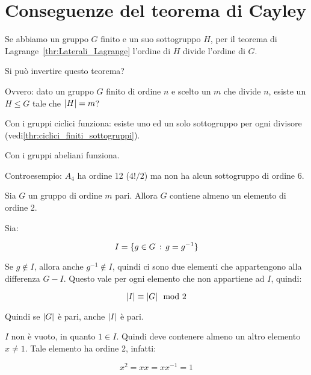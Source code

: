 \chapter{Conseguenze del teorema di Cayley}

Se abbiamo un gruppo $G$ finito e un suo sottogruppo $H$, per il teorema di Lagrange~\ref{thr:Laterali_Lagrange} l'ordine di $H$ divide l'ordine di $G$.

Si può invertire questo teorema?

Ovvero: dato un gruppo $G$ finito di ordine $n$ e scelto un $m$ che divide $n$, esiste un $H \le G$ tale che $\lvert H \rvert = m$?

Con i gruppi ciclici funziona: esiste uno ed un solo sottogruppo per ogni divisore (vedi\ref{thr:ciclici_finiti_sottogruppi}).

Con i gruppi abeliani funziona.

Controesempio: $A_4$ ha ordine 12 ($4!/2$) ma non ha alcun sottogruppo di ordine 6.

\begin{lemma}
	\label{lmm:per_conseguenza_Cayley}
	Sia $G$ un gruppo di ordine $m$ pari. Allora $G$ contiene almeno un elemento di ordine 2.
\end{lemma}
\begin{dimostrazione}
	Sia:
	
	\begin{equation}
		I = \{g \in G \,:\, g = g^{-1}\}
	\end{equation}

	Se $g \not\in I$, allora anche $g^{-1} \not\in I$, quindi ci sono due elementi che appartengono alla differenza $G - I$. Questo vale per ogni elemento che non appartiene ad $I$, quindi:
	
	\begin{equation}
		\lvert I \rvert \equiv \lvert G \rvert \mod 2
	\end{equation}

	Quindi se $\lvert G \rvert$ è pari, anche $\lvert I \rvert$ è pari.
	
	$I$ non è vuoto, in quanto $1 \in I$. Quindi deve contenere almeno un altro elemento $x \ne 1$. Tale elemento ha ordine 2, infatti:
	
	\begin{equation}
		x^2 = xx = xx^{-1} = 1
	\end{equation}
\end{dimostrazione}

